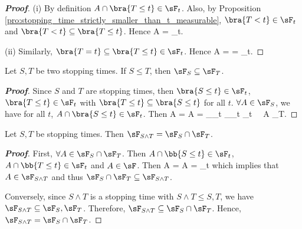 \begin{proof}[\bf Proof]
\ben
\item [(i)] By definition $A\cap \bra{T\leq t} \in \sF_t$. Also, by Proposition \ref{pro:stopping_time_strictly_smaller_than_t_measurable}, $\bra{T<t}\in \sF_t$ and $\bra{T<t}\subseteq \bra{T\leq t}$. Hence
\be
A\cap {} = \cap {} \in \sF_t.
\ee

\item [(ii)] Similarly, $\bra{T=t} \subseteq \bra{T\leq t} \in \sF_t$. Hence
\be
A\cap {} =  \cap {} =  \cap {} \in \sF_t. 
\ee
\een
\end{proof}

\begin{proposition}\label{pro:sigma_algebra_stopping_times_continuous_increasing}
Let $S,T$ be two stopping times. If $S\leq T$, then $\sF_S \subseteq \sF_T$.
\end{proposition}

\begin{proof}[\bf Proof]
Since $S$ and $T$ are stopping times, then $\bra{S \leq t}\in \sF_t$, $\bra{T \leq t}\in \sF_t$ with $\bra{T\leq t} \subseteq \bra{S\leq t}$ for all $t$. $\forall A \in \sF_S$, we have for all $t$, $A \cap \bra{S \leq t} \in \sF_t$. Then
\be
A \cap {} = A \cap {} = _{\in \sF_t} \cap {}_{\in \sF_t} \in \sF_t \ \ra \ A \in \sF_T.
\ee
\end{proof}


\begin{proposition}
Let $S,T$ be stopping times. Then $\sF_{S\land T} = \sF_S\cap \sF_T$.
\end{proposition}

\begin{proof}[\bf Proof]
First, $\forall A\in \sF_S\cap \sF_T$. Then $A\cap \bb{S\leq t}\in\sF_t$, $A\cap \bb{T\leq t}\in\sF_t$ and $A\in \sF$. Then
\be
A\cap {} = A\cap {} =   \cup {} \in \sF_t
\ee
which implies that $A\in \sF_{S\land T}$ and thus $\sF_S\cap \sF_T \subseteq \sF_{S\land T}$.

Conversely, since $S\land T$ is a stopping time with $S\land T\leq S,T$, we have $\sF_{S\land T} \subseteq \sF_S,\sF_T$. Therefore, $\sF_{S\land T}\subseteq \sF_S \cap \sF_T$. Hence, $\sF_{S\land T} = \sF_S \cap \sF_T$.
\end{proof}




